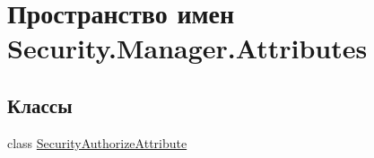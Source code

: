 \hypertarget{namespace_security_1_1_manager_1_1_attributes}{}\section{Пространство имен Security.\+Manager.\+Attributes}
\label{namespace_security_1_1_manager_1_1_attributes}
\subsection*{Классы}
\begin{DoxyCompactItemize}
\item 
class \hyperlink{class_security_1_1_manager_1_1_attributes_1_1_security_authorize_attribute}{Security\+Authorize\+Attribute}
\end{DoxyCompactItemize}
